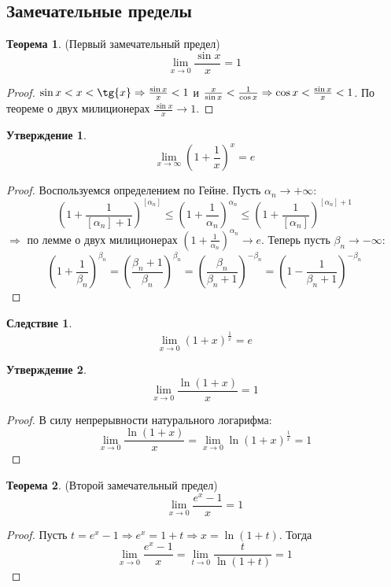 \documentclass[a4paper, 12pt]{article}
\theoremstyle{definition}
\newtheorem*{theorem}{Теорема}
\newtheorem*{consequense}{Следствие}
\newtheorem*{statement}{Утверждение}
\begin{document}
    \subsection{Замечательные пределы}
        \begin{theorem} (Первый замечательный предел)
            \[\lim\limits_{x\to 0} \frac{\sin{x}}{x}=1\]
        \end{theorem}     
        \begin{proof}
            $\sin{x}<x<\tg{x}\Rightarrow \frac{\sin{x}}{x}<1$ и $\frac{x}{\sin{x}}<\frac{1}{\cos{x}}\\
            \Rightarrow \cos{x}<\frac{\sin{x}}{x}<1$. По теореме о двух милиционерах $\frac{\sin{x}}{x}\to 1$.
        \end{proof}
        \begin{statement}
            \[\lim\limits_{x\to \infty}(1+\frac{1}{x})^x=e\]
        \end{statement} 
        \begin{proof}
            Воспользуемся определением по Гейне. Пусть $\alpha_n\to +\infty$:\\
            \[(1+\frac{1}{[\alpha_n]+1})^{[\alpha_n]} \leq(1+\frac{1}{\alpha_n})^{\alpha_n}\leq (1+\frac{1}{[\alpha_n]})^{[\alpha_n]+1}\]
            $\Rightarrow$ по лемме о двух милиционерах $(1+\frac{1}{\alpha_n})^{\alpha_n}\to e$. Теперь пусть $\beta_n\to -\infty$:
            \[(1+\frac{1}{\beta_n})^{\beta_n}=(\frac{\beta_n+1}{\beta_n})^{\beta_n}=(\frac{\beta_n}{\beta_n+1})^{-\beta_n}=(1-\frac{1}{\beta_n+1})^{-\beta_n}\]
        \end{proof} 
        \begin{consequense}
            \[\lim\limits_{x\to 0}(1+x)^{\frac{1}{x}}=e\]
        \end{consequense} 
        \begin{statement}
            \[\lim\limits_{x\to 0}\frac{\ln{(1+x)}}{x}=1\]
        \end{statement} 
        \begin{proof} В силу непрерывности натурального логарифма:
            \[\lim\limits_{x\to 0}\frac{\ln{(1+x)}}{x}=\lim\limits_{x\to 0}\ln{(1+x)^{\frac{1}{x}}}=1\]
        \end{proof} 
        \begin{theorem} (Второй замечательный предел)\\
            \[\lim\limits_{x\to 0}\frac{e^x-1}{x}=1\]
        \end{theorem} 
        \begin{proof}
            Пусть $t=e^x-1 \Rightarrow e^x=1+t \Rightarrow x=\ln{(1+t)}$. Тогда 
            \[\lim\limits_{x\to 0}\frac{e^x-1}{x}=\lim\limits_{t\to 0}\frac{t}{\ln{(1+t)}}=1\]
        \end{proof} 
        \newpage
\end{document}
